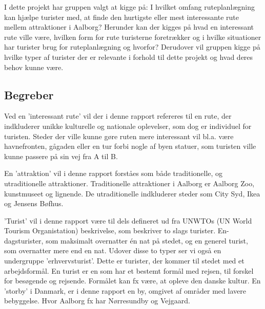 I dette projekt har gruppen valgt at kigge på: I hvilket omfang ruteplanlægning kan hjælpe turister med, at finde den hurtigste eller mest interessante rute mellem attraktioner i Aalborg? Herunder kan der kigges på hvad en interessant rute ville være, hvilken form for rute turisterne foretrækker og i hvilke situationer har turister brug for ruteplanlægning og hvorfor? Derudover vil gruppen kigge på hvilke typer af turister der er relevante i forhold til dette projekt og hvad deres behov kunne være. \newline \newpage

\subsection{Begreber}
Ved en ’interessant rute’ vil der i denne rapport refereres til en rute, der indkluderer unikke kulturelle og nationale oplevelser, som dog er individuel for turisten. Steder der ville kunne gøre ruten mere interessant vil bl.a. være havnefronten, gågaden eller en tur forbi nogle af byen statuer, som turisten ville kunne passere på sin vej fra A til B.\newline

En ’attraktion’ vil i denne rapport forståes som både traditionelle, og utraditionelle attraktioner. Traditionelle attraktioner i Aalborg er Aalborg Zoo, kunstmuseet og lignende. De utraditionelle indkluderer steder som City Syd, Ikea og Jensens Bøfhus.\newline

’Turist’ vil i denne rapport være til dels defineret ud fra UNWTOs (UN World Tourism Organistation) beskrivelse, som beskriver to slags turister. En-dagsturister, som maksimalt overnatter én nat på stedet, og en generel turist, som overnatter mere end en nat\citep{Turismen}. Udover disse to typer ser vi også en undergruppe ’erhvervsturist’. Dette er turister, der kommer til stedet med et arbejdsformål. \newline
En turist er en som har et bestemt formål med rejsen, til forskel for besøgende og rejsende. Formålet kan fx være, at opleve den danske kultur. \newline
En ’storby’ i Danmark, er i denne rapport en by, omgivet af områder med lavere bebyggelse. Hvor Aalborg fx har Nørresundby og Vejgaard.

